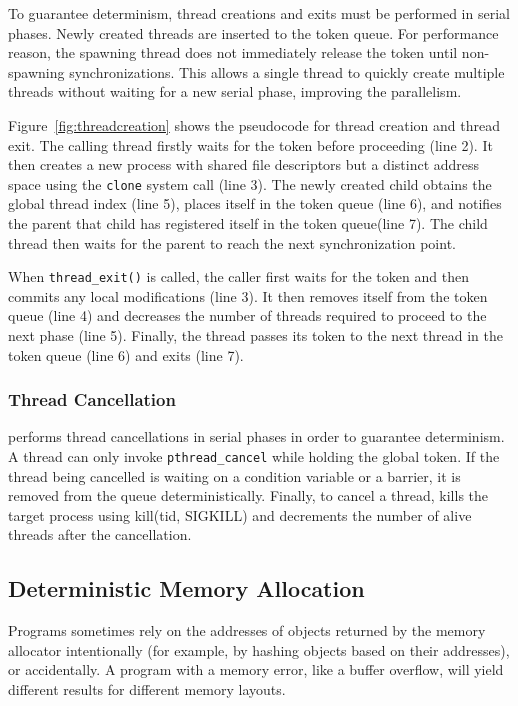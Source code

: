 To guarantee determinism, thread creations and exits must be performed in serial phases.  Newly created threads are inserted to the token queue.  For performance reason, the spawning thread does not immediately release the token until non-spawning synchronizations. This allows a single thread to quickly create multiple threads without waiting for a new serial phase, improving the parallelism.

Figure~\ref{fig:threadcreation} shows the pseudocode for thread creation and thread exit. The calling thread firstly waits for the token before proceeding (line 2).  It then creates a new process with shared file descriptors but a distinct address space using the \texttt{clone} system call (line 3).  The newly created child obtains the global thread index (line 5), places itself in the token queue (line 6), and notifies the parent that child has registered itself in the token queue(line 7). The child thread then waits for the parent to reach the next synchronization point. 

When \texttt{thread\_exit()} is called, the caller first waits for the token and then commits any local modifications (line 3). It then removes itself from the token queue (line 4) and decreases the number of threads required to proceed to the next phase (line 5). Finally, the thread passes its token to the next thread in the token queue (line 6) and exits (line 7).

\subsubsection{Thread Cancellation}

\dthreads{} performs thread cancellations in serial phases in order to guarantee determinism. A thread can only invoke \texttt{pthread\_cancel} while holding the global token. If the thread being cancelled is waiting on a condition variable or a barrier, it is removed from the queue deterministically. Finally, to cancel a thread, \dthreads{} kills the target process using kill(tid, SIGKILL) and decrements the number of alive threads after the cancellation.

\subsection{Deterministic Memory Allocation}
Programs sometimes rely on the addresses of objects returned by the memory allocator intentionally (for example, by hashing objects based on their addresses), or accidentally. A program with a memory error, like a buffer overflow, will yield different results for different memory layouts.

